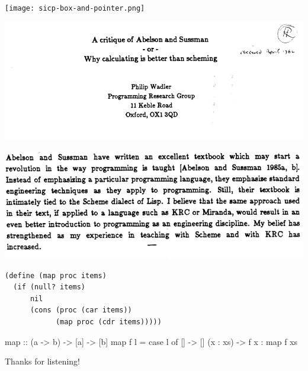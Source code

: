 \documentclass[UKenglish,usenames,dvipsnames,svgnames,table,aspectratio=169,mathserif]{beamer}
\newcommand{\nl}{\vspace{\baselineskip}}
\begin{document}
\begin{frame}
\centering
\texttt{[image: sicp-box-and-pointer.png]}
\end{frame}


\begin{frame}
\centering
\includegraphics[scale=0.5]{wadler-title.png}
\end{frame}


\begin{frame}
\centering
\includegraphics[scale=0.55]{wadler-abstract.png}
\end{frame}


\begin{frame}[fragile]
\begin{Verbatim}
(define (map proc items)
  (if (null? items)
      nil
      (cons (proc (car items))
            (map proc (cdr items)))))
\end{Verbatim}
\nl

\begin{haskellcode}
map :: (a -> b) -> [a] -> [b]
map f l =
  case l of
    []       -> []
    (x : xs) -> f x : map f xs
\end{haskellcode}
\end{frame}


\begin{frame}
\huge \centering
Thanks for listening!
\end{frame}


\end{document}
